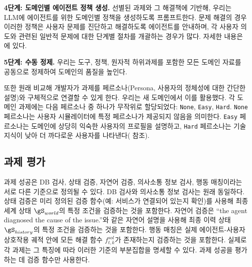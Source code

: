 \textbf{4단계: 도메인별 에이전트 정책 생성.}
선별된 과제와 그 해결책에 기반해, 우리는 LLM에 에이전트를 위한 도메인별 정책을 생성하도록 프롬프트한다. 문제 해결의 경우 이러한 정책은 사용자 문제를 진단하고 해결하도록 에이전트를 안내하며, 각 사용자 의도와 관련된 일반적 문제에 대한 단계별 절차를 개괄하는 경우가 많다. 자세한 내용은 에 있다.

\textbf{5단계: 수동 정제.} 우리는 도구, 정책, 원자적 하위과제를 포함한 모든 도메인 자료를 공동으로 정제하여 도메인의 품질을 높인다.

또한 원래  비교해  개발자가 과제를 페르소나(Persona, 사용자의 정체성에 대한 간단한 설명)와 구체적으로 연결할 수 있게 한다.
우리는 새 도메인에서 이를 활용했다. 각 \telecom 도메인 과제에는 다음 페르소나 중 하나가 무작위로 할당되었다: \texttt{None}, \texttt{Easy}, \texttt{Hard}. \texttt{None} 페르소나는 사용자 시뮬레이터에 특정 페르소나가 제공되지 않음을 의미한다. \texttt{Easy} 페르소나는 도메인에 상당히 익숙한 사용자의 프로필을 설명하고, \texttt{Hard} 페르소나는 기술 지식이 낮아 더 까다로운 사용자를 나타낸다( 참조).

\subsection{과제 평가}
과제 성공은 DB 검사, 상태 검증, 자연어 검증, 의사소통 정보 검사, 행동 매칭이라는 서로 다른 기준으로 정의될 수 있다.
DB 검사와 의사소통 정보 검사는 원래  동일하다. 상태 검증은 미리 정의된 검증 함수(예: 서비스가 연결되어 있는지 확인)를 사용해 최종 세계 상태 $\gS_{world}$의 특정 조건을 검증하는 것을 포함한다. 자연어 검증은 ``the agent diagnosed the cause of the issue.''와 같은 자연어 설명을 사용해 최종 이력 상태 $\gS_{history}$의 특정 조건을 검증하는 것을 포함한다. 행동 매칭은 실제 에이전트-사용자 상호작용 궤적 안에 모든 해결 함수 $f_{t,k}^{sol}$가 존재하는지 검증하는 것을 포함한다.
실제로 각 과제는 그 특징에 따라 이러한 기준의 부분집합을 명세할 수 있다.  과제 성공을 평가하는 데 검증 함수만 사용한다.



